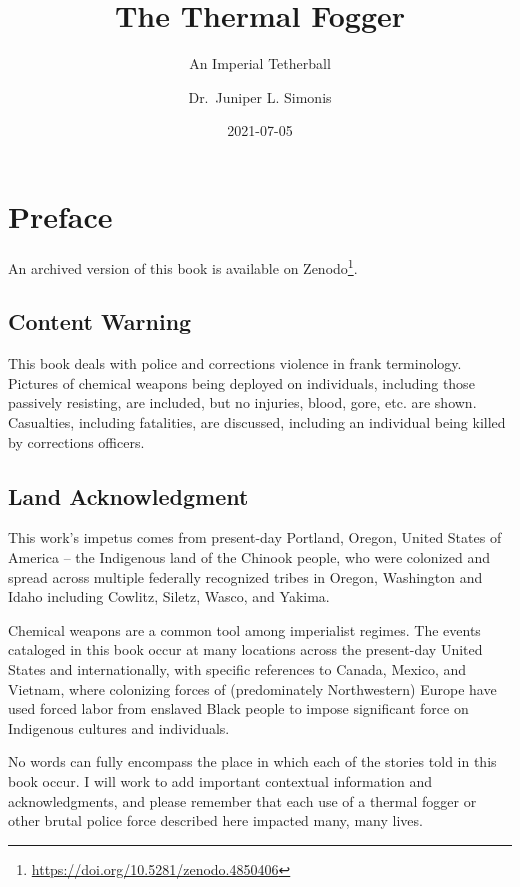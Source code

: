 \documentclass[
  11pt,
]{krantz}
\title{The Thermal Fogger}
\subtitle{An Imperial Tetherball}
\author{Dr.~Juniper L. Simonis}
\date{2021-07-05}
\renewcommand{\href}[2]{#2\footnote{\url{#1}}}
\begin{document}
\maketitle



{
\hypersetup{linkcolor=}
\setcounter{tocdepth}{2}
\tableofcontents
}
\listoffigures
\hypertarget{preface}{%
\chapter*{Preface}\label{preface}}


\href{https://doi.org/10.5281/zenodo.4850406}{An archived version of this book is available on Zenodo}.

\hypertarget{content-warning}{%
\section*{Content Warning}\label{content-warning}}


This book deals with police and corrections violence in frank terminology.
Pictures of chemical weapons being deployed on individuals, including those passively resisting, are included, but no injuries, blood, gore, etc. are shown.
Casualties, including fatalities, are discussed, including an individual being killed by corrections officers.

\hypertarget{land-acknowledgment}{%
\section*{Land Acknowledgment}\label{land-acknowledgment}}


This work's impetus comes from present-day Portland, Oregon, United States of America -- the Indigenous land of the Chinook people, who were colonized and spread across multiple federally recognized tribes in Oregon, Washington and Idaho including Cowlitz, Siletz, Wasco, and Yakima.

Chemical weapons are a common tool among imperialist regimes.
The events cataloged in this book occur at many locations across the present-day United States and internationally, with specific references to Canada, Mexico, and Vietnam, where colonizing forces of (predominately Northwestern) Europe have used forced labor from enslaved Black people to impose significant force on Indigenous cultures and individuals.

No words can fully encompass the place in which each of the stories told in this book occur.
I will work to add important contextual information and acknowledgments, and please remember that each use of a thermal fogger or other brutal police force described here impacted many, many lives.
\end{document}
